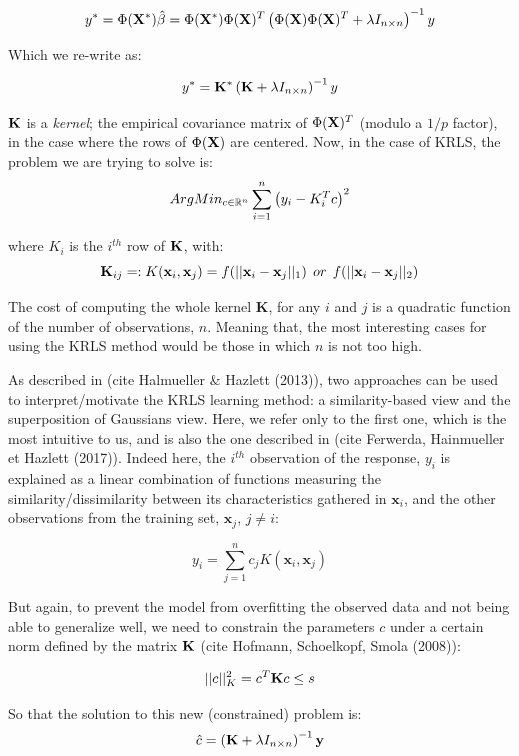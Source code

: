 $$
y^* = \Phi({\bf X^*})\hat{\beta} = \Phi({\bf X^*})\Phi({\bf X})^T \left( \Phi({\bf X})\Phi({\bf X})^T + \lambda I_{n \times n} \right)^{-1} y
$$

Which we re-write as:

$$
y^* =  {\bf K^*} \left( {\bf K} + \lambda I_{n \times n} \right)^{-1} y
$$

${\bf K}$ is a {\it kernel}; the empirical covariance matrix of $\Phi({\bf X})^T$ (modulo a $1/p$ factor), in the case where the rows of $\Phi({\bf X})$ are centered. Now, in the case of KRLS, the problem we are trying to solve is:
$$
ArgMin_{c \in \mathbb{R}^n} \sum_{i = 1}^n \left( y_i - K_i^T c \right)^2
$$

where $K_i$ is the $i^{th}$ row of ${\bf K}$, with:
$$
{\bf K}_{ij} =: K(\textbf{x}_i, \textbf{x}_j) = f(||\textbf{x}_i - \textbf{x}_j||_1) \: \: or \: \: f(||\textbf{x}_i - \textbf{x}_j||_2)
$$

The cost of computing the whole kernel {\bf K}, for any $i$ and $j$ is a quadratic function of the number of observations, $n$. Meaning that, the most interesting cases for using the KRLS method would be those in which $n$ is not too high.

As described in (cite Halmueller \& Hazlett (2013)), two approaches can be used to interpret/motivate the KRLS learning method: a similarity-based view and the superposition of Gaussians view. Here, we refer only to the first one, which is the most intuitive to us, and is also the one described in (cite Ferwerda, Hainmueller et Hazlett (2017)). Indeed here, the $i^{th}$ observation of the response, $y_i$ is explained as a linear combination of functions measuring the similarity/dissimilarity between its characteristics gathered in $\textbf{x}_i$, and the other observations from the training set, $\textbf{x}_j$, $j \neq i$:

\begin{equation}
\label{eq:comblinresponse}
y_i = \sum_{j = 1}^n c_j K(\textbf{x}_i, \textbf{x}_j)
\end{equation}

But again, to prevent the model from overfitting the observed data and not being able to generalize well, we need to constrain the parameters $c$ under a certain norm defined by the matrix ${\bf K}$ (cite Hofmann, Schoelkopf, Smola (2008)):

$$
||c||^2_K = c^T {\bf K}  c  \leq s
$$

So that the solution to this new (constrained) problem is:
$$
\hat{c} = \left( {\bf K}  + \lambda I_{n \times n} \right)^{-1}{\bf y}\\
$$


